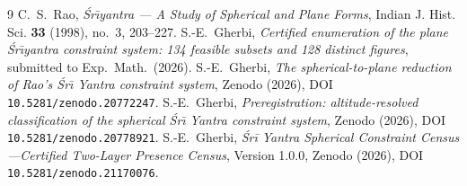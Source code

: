 \documentclass[11pt]{article}
\begin{document}
\begin{thebibliography}{9}
 C.~S.~Rao, \emph{\'Sr\={\i}yantra --- A Study of Spherical and Plane Forms}, Indian J. Hist. Sci. \textbf{33} (1998), no.~3, 203--227.
 S.-E.~Gherbi, \emph{Certified enumeration of the plane \'Sr\={\i}yantra constraint system: 134 feasible subsets and 128 distinct figures}, submitted to Exp.\ Math.\ (2026).
 S.-E.~Gherbi, \emph{The spherical-to-plane reduction of Rao's \'Sr\={\i} Yantra constraint system}, Zenodo (2026), DOI \texttt{10.5281/zenodo.20772247}.
 S.-E.~Gherbi, \emph{Preregistration: altitude-resolved classification of the spherical \'Sr\={\i} Yantra constraint system}, Zenodo (2026), DOI \texttt{10.5281/zenodo.20778921}.
 S.-E.~Gherbi, \emph{Śrī Yantra Spherical Constraint Census---Certified Two-Layer Presence Census}, Version 1.0.0, Zenodo (2026), DOI \texttt{10.5281/zenodo.21170076}.
\end{thebibliography}
\end{document}
